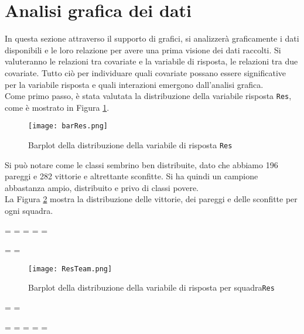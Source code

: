 \section{Analisi grafica dei dati}
In questa sezione attraverso il supporto di grafici, si analizzerà graficamente i dati disponibili e le loro relazione per avere una prima visione dei dati raccolti. Si valuteranno le relazioni tra covariate e la variabile di risposta, le relazioni tra due covariate. Tutto ciò per individuare quali covariate possano essere significative per la variabile risposta e quali interazioni emergono dall'analisi grafica.\\

Come primo passo, è stata valutata la distribuzione della variabile risposta \texttt{Res}, come è mostrato in Figura \ref{fig:res}.

\begin{figure}[htbp]
	\begin{center}
		\texttt{[image: barRes.png]}
		\caption{Barplot della distribuzione della variabile di risposta \texttt{Res}} \label{fig:res}
	\end{center}
\end{figure}

Si può notare come le classi sembrino ben distribuite, dato che abbiamo 196 pareggi e 282 vittorie e altrettante sconfitte. Si ha quindi un campione abbastanza ampio, distribuito e privo di classi povere.\\

La Figura \ref{fig:team} mostra la distribuzione delle vittorie, dei pareggi e delle sconfitte per ogni squadra.

\newpage
\paperwidth=\pdfpageheight
\paperheight=\pdfpagewidth
\pdfpageheight=\paperheight
\pdfpagewidth=\paperwidth
\headwidth=\textheight

\begingroup 
\vsize=\textwidth
\hsize=\textheight


\pagestyle{empty}
\begin{figure}[htbp]
	\begin{center}
		\texttt{[image: ResTeam.png]}
		\caption{Barplot della distribuzione della variabile di risposta per squadra\texttt{Res}} \label{fig:team}
	\end{center}
\end{figure}

\textwidth=\hsize
\textheight=\vsize

\endgroup
\newpage
\paperwidth=\pdfpageheight
\paperheight=\pdfpagewidth
\pdfpageheight=\paperheight
\pdfpagewidth=\paperwidth
\headwidth=\textwidth


